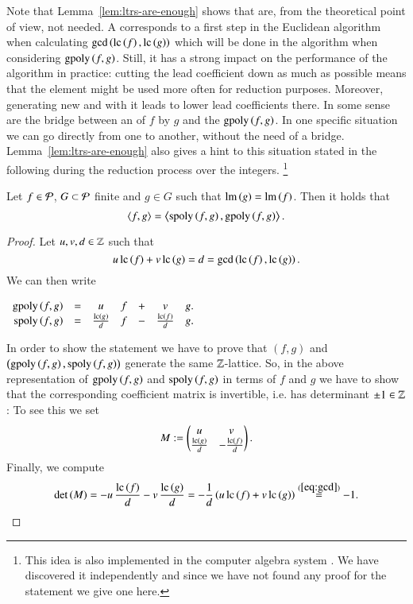 Note that Lemma~\ref{lem:ltrs-are-enough} shows that \lcrs are, from the
theoretical point of view, not needed. A \lcr corresponds
to a first step in the Euclidean algorithm when calculating $\gcd\left(\mathrm{lc}\left({f}\right), \mathrm{lc}\left({g}\right)\right)$ which will be done in the algorithm when considering $\mathrm{gpoly}\left({f},{g}\right)$.
Still, it has a strong impact on the performance of the algorithm in practice:
cutting the lead coefficient down as much as possible means that the element
might be used more often for reduction purposes. Moreover, generating new \spts
and \gpts with it leads to lower lead coefficients there. In some sense \lcrs are
the bridge between an \ltr of $f$ by $g$ and the $\mathrm{gpoly}\left({f},{g}\right)$. In one specific
situation we can go directly from one to another, without the need of a bridge. 
Lemma~\ref{lem:ltrs-are-enough} also gives a hint to this situation stated in
the following
during the reduction process over the integers.
\footnote{This idea is also implemented in the computer algebra system
\macaulay. We have discovered it independently and since we have not
found any proof for the statement we give one here.}
\begin{lemma}
Let $f \in \mathcal{P}$, $G \subset \mathcal{P}$ finite and $g\in G$ such that
$\operatorname{lm}\left({g}\right) = \operatorname{lm}\left({f}\right)$. Then it holds that
\[\left\langle f,g\right\rangle
  = \left\langle \mathrm{spoly}\left({f},{g}\right), \mathrm{gpoly}\left({f},{g}\right)\right\rangle.\]
  \label{lem:m2-replace-trick}
\end{lemma}

\begin{proof}
Let $u,v, d \in \mathbb{Z}$ such that
\begin{equation}
u\, \mathrm{lc}\left({f}\right) + v\, \mathrm{lc}\left({g}\right) = d = \gcd\left(\mathrm{lc}\left({f}\right), \mathrm{lc}\left({g}\right)\right).
\label{eq:gcd}
\end{equation}
We can then write
\begin{center}
$
\begin{array}[]{rcccccc}
\gpoly fg &= & u& f& + &v& g.\\
\spoly fg &=& \frac{\lc g}{d}& f& - &\frac{\lc f}{d}&g.
\end{array}
$
\end{center}
In order to show the statement we have to prove that $(f,g)$ and $\left(\mathrm{gpoly}\left({f},{g}\right),
\mathrm{spoly}\left({f},{g}\right)\right)$ generate the same $\mathbb{Z}$-lattice. So, in the above
representation of $\mathrm{gpoly}\left({f},{g}\right)$ and $\mathrm{spoly}\left({f},{g}\right)$ in terms of $f$ and $g$ we have to
show that the corresponding coefficient matrix is invertible, i.e. has
determinant $\pm 1 \in \mathbb{Z}$:
To see this we set
\[M := \begin{pmatrix} u & v\\ \frac{\mathrm{lc}\left({g}\right)}{d} & -\frac{\mathrm{lc}\left({f}\right)}{d}\end{pmatrix}.\]
Finally, we compute
\[\det\left(M\right) = - u\, \frac{\mathrm{lc}\left({f}\right)}{d}
- v\, \frac{\mathrm{lc}\left({g}\right)}{d} = -\frac 1d \left(u\, \mathrm{lc}\left({f}\right) + v\, \mathrm{lc}\left({g}\right)\right)
  \stackrel{(\ref{eq:gcd})}{=} -1.\]
\end{proof}

